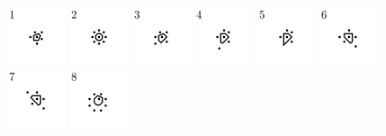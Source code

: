 \documentclass[text.tex]{subfiles}
\begin{document}
 

\begin{figure}[h!]
\centering
\includegraphics[width=0.1363\textwidth]{img/results/octagon_concat/octagon_100000_(1_0alpha_1)_001.pdf}
\includegraphics[width=0.1363\textwidth]{img/results/octagon_concat/octagon_100000_(1_0alpha_1)_002.pdf}
\includegraphics[width=0.1363\textwidth]{img/results/octagon_concat/octagon_100000_(1_0alpha_1)_003.pdf}
\includegraphics[width=0.1363\textwidth]{img/results/octagon_concat/octagon_100000_(1_0alpha_1)_004.pdf}
\includegraphics[width=0.1363\textwidth]{img/results/octagon_concat/octagon_100000_(1_0alpha_1)_005.pdf}
\includegraphics[width=0.1363\textwidth]{img/results/octagon_concat/octagon_100000_(1_0alpha_1)_006.pdf}
\includegraphics[width=0.1363\textwidth]{img/results/octagon_concat/octagon_100000_(1_0alpha_1)_007.pdf}
\includegraphics[width=0.1363\textwidth]{img/results/octagon_concat/octagon_100000_(1_0alpha_1)_008.pdf}

\end{figure}
\end{document}
